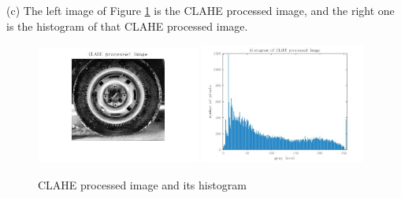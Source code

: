 (c) The left image of Figure \ref{fig:p1c} is the CLAHE processed image, and the right one is 
the histogram of that CLAHE processed image.\\

\begin{figure}[htbp]
    \centering
	\includegraphics[width=0.48\textwidth]{../images/p1c_image.jpg}
	\includegraphics[width=0.48\textwidth]{../images/p1c_histogram.jpg}
    \caption{CLAHE processed image and its histogram}
    \label{fig:p1c}
\end{figure}

\newpage